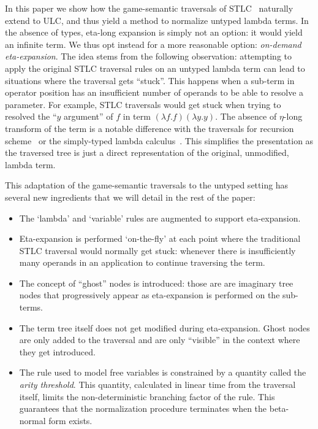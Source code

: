 \documentclass{article}
\theoremstyle{definition}
\begin{document}
In this paper we show how the game-semantic traversals of STLC~\cite{BlumPhd} naturally extend to ULC, and thus yield a method to normalize untyped lambda terms. In the absence of types, eta-long expansion is simply not an option: it would yield an infinite term. We thus opt instead for a more reasonable option: \emph{on-demand eta-expansion}. The idea stems from the following observation: attempting to apply the original STLC traversal rules on an untyped lambda term can lead to situations where the traversal gets ``stuck''. This happens when a sub-term in operator position has an insufficient number of operands to be able to resolve a parameter. For example, STLC traversals would get stuck when trying to resolved the ``$y$ argument'' of $f$ in term $(\lambda f.f)(\lambda y.y)$. The absence of $\eta$-long transform of the term is a notable difference with the traversals for recursion scheme~\cite{Ong2006} or the simply-typed lambda calculus~\cite{BlumPhd}. This simplifies the presentation as the traversed tree is just a direct representation of the original, unmodified, lambda term.

This adaptation of the game-semantic traversals to the untyped setting has several new ingredients that we will detail in the rest of the paper:
\begin{itemize}
\item  The `lambda' and `variable' rules are augmented to support eta-expansion.
 \item Eta-expansion is performed `on-the-fly' at each point where the traditional STLC traversal would normally get stuck: whenever there is insufficiently many operands in an application to continue traversing the term.
\item The concept of ``ghost'' nodes is introduced: those are are imaginary tree nodes that progressively appear as eta-expansion is performed on the sub-terms.
\item The term tree itself does not get modified during eta-expansion. Ghost nodes are only added to the traversal and are only ``visible'' in the context where they get introduced.
\item The rule used to model free variables is constrained by a quantity called the \emph{arity threshold}. This quantity, calculated in linear time from the traversal itself, limits the non-deterministic branching factor of the rule. This guarantees that the normalization procedure terminates when the beta-normal form exists.
\end{itemize}
\end{document}
